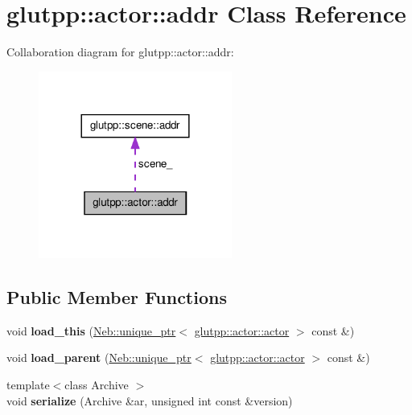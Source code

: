\hypertarget{classglutpp_1_1actor_1_1addr}{\section{glutpp\-:\-:actor\-:\-:addr \-Class \-Reference}
\label{classglutpp_1_1actor_1_1addr}
}


\-Collaboration diagram for glutpp\-:\-:actor\-:\-:addr\-:
\nopagebreak
\begin{figure}[H]
\begin{center}
\leavevmode
\includegraphics[width=180pt]{classglutpp_1_1actor_1_1addr__coll__graph}
\end{center}
\end{figure}
\subsection*{\-Public \-Member \-Functions}
\begin{DoxyCompactItemize}
\item 
\hypertarget{classglutpp_1_1actor_1_1addr_a432486e8010639579940591cbbc354b2}{void {\bfseries load\-\_\-this} (\hyperlink{classNeb_1_1unique__ptr}{\-Neb\-::unique\-\_\-ptr}$<$ \hyperlink{classglutpp_1_1actor_1_1actor}{glutpp\-::actor\-::actor} $>$ const \&)}\label{classglutpp_1_1actor_1_1addr_a432486e8010639579940591cbbc354b2}

\item 
\hypertarget{classglutpp_1_1actor_1_1addr_aa8d769177daf4e80e512e254d3ccb5d0}{void {\bfseries load\-\_\-parent} (\hyperlink{classNeb_1_1unique__ptr}{\-Neb\-::unique\-\_\-ptr}$<$ \hyperlink{classglutpp_1_1actor_1_1actor}{glutpp\-::actor\-::actor} $>$ const \&)}\label{classglutpp_1_1actor_1_1addr_aa8d769177daf4e80e512e254d3ccb5d0}

\item 
\hypertarget{classglutpp_1_1actor_1_1addr_a4ae74163dadaeb15c4fc25afc4066aea}{{\footnotesize template$<$class Archive $>$ }\\void {\bfseries serialize} (\-Archive \&ar, unsigned int const \&version)}\label{classglutpp_1_1actor_1_1addr_a4ae74163dadaeb15c4fc25afc4066aea}

\end{DoxyCompactItemize}
